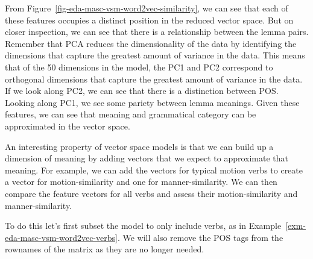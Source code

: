 \documentclass[
  letterpaper,
  DIV=11,
  numbers=noendperiod]{scrreprt}
\theoremstyle{definition}
\theoremstyle{remark}
\begin{document}
From Figure~\ref{fig-eda-masc-vsm-word2vec-similarity}, we can see that
each of these features occupies a distinct position in the reduced
vector space. But on closer inspection, we can see that there is a
relationship between the lemma pairs. Remember that PCA reduces the
dimensionality of the data by identifying the dimensions that capture
the greatest amount of variance in the data. This means that of the 50
dimensions in the model, the PC1 and PC2 correspond to orthogonal
dimensions that capture the greatest amount of variance in the data. If
we look along PC2, we can see that there is a distinction between POS.
Looking along PC1, we see some pariety between lemma meanings. Given
these features, we can see that meaning and grammatical category can be
approximated in the vector space.

An interesting property of vector space models is that we can build up a
dimension of meaning by adding vectors that we expect to approximate
that meaning. For example, we can add the vectors for typical motion
verbs to create a vector for motion-similarity and one for
manner-similarity. We can then compare the feature vectors for all verbs
and assess their motion-similarity and manner-similarity.

To do this let's first subset the model to only include verbs, as in
Example~\ref{exm-eda-masc-vsm-word2vec-verbs}. We will also remove the
POS tags from the rownames of the matrix as they are no longer needed.
\end{document}
